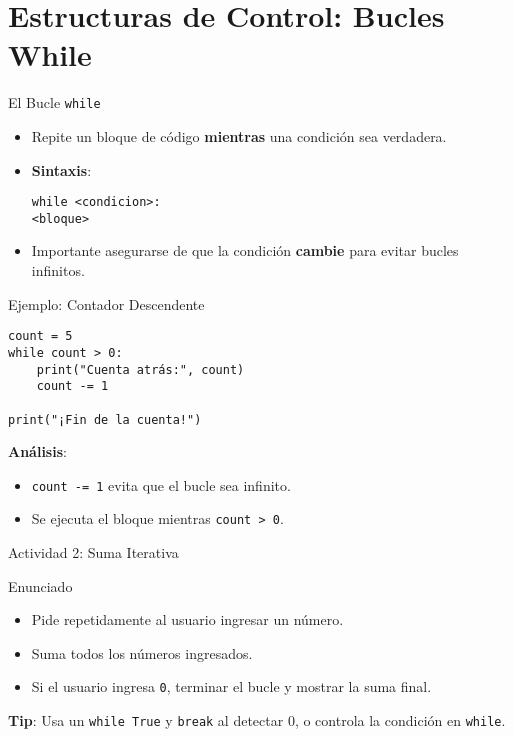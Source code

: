 \documentclass[10pt]{beamer}
\begin{document}
\section{Estructuras de Control: Bucles While}

\begin{frame}{El Bucle \texttt{while}}
  \begin{itemize}
    \item Repite un bloque de código \textbf{mientras} una condición sea verdadera.
    \item \textbf{Sintaxis}:

\texttt{while <condicion>:} \\
\quad \texttt{<bloque>}

    \item Importante asegurarse de que la condición \textbf{cambie} para evitar bucles infinitos.
  \end{itemize}
\end{frame}

\begin{frame}[fragile]{Ejemplo: Contador Descendente}
\begin{verbatim}
count = 5
while count > 0:
    print("Cuenta atrás:", count)
    count -= 1

print("¡Fin de la cuenta!")
\end{verbatim}
\textbf{Análisis}:
\begin{itemize}
  \item \texttt{count -= 1} evita que el bucle sea infinito.
  \item Se ejecuta el bloque mientras \texttt{count > 0}.
\end{itemize}
\end{frame}

\begin{frame}{Actividad 2: Suma Iterativa}
  \begin{block}{Enunciado}
    \begin{itemize}
      \item Pide repetidamente al usuario ingresar un número.
      \item Suma todos los números ingresados.
      \item Si el usuario ingresa \texttt{0}, terminar el bucle y mostrar la suma final.
    \end{itemize}
  \end{block}
  \textbf{Tip}: Usa un \texttt{while True} y \texttt{break} al detectar 0, o controla la condición en \texttt{while}.
\end{frame}
\end{document}
